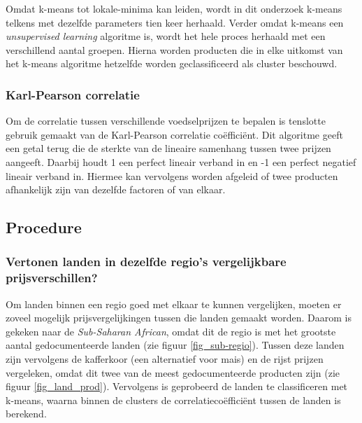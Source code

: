 \documentclass{article}
\begin{document}
Omdat k-means tot lokale-minima kan leiden, wordt in dit onderzoek k-means telkens met dezelfde parameters tien keer herhaald. Verder omdat k-means een \textit{unsupervised learning} algoritme is, wordt het hele proces herhaald met een verschillend aantal groepen. Hierna worden producten die in elke uitkomst van het k-means algoritme hetzelfde worden geclassificeerd als cluster beschouwd.


\subsubsection*{Karl-Pearson correlatie}
Om de correlatie tussen verschillende voedselprijzen te bepalen is tenslotte gebruik gemaakt van de Karl-Pearson correlatie coëfficiënt.
Dit algoritme geeft een getal terug die de sterkte van de lineaire samenhang tussen twee prijzen aangeeft. Daarbij houdt 1 een perfect lineair verband in en -1 een perfect negatief lineair verband in. Hiermee kan vervolgens worden afgeleid of twee producten afhankelijk zijn van dezelfde factoren of van elkaar.


\subsection*{Procedure}

\subsubsection*{Vertonen landen in dezelfde regio’s vergelijkbare prijsverschillen?}
Om landen binnen een regio goed met elkaar te kunnen vergelijken, moeten er zoveel mogelijk prijsvergelijkingen tussen die landen gemaakt worden. Daarom is gekeken naar de \textit{Sub-Saharan African}, omdat dit de regio is met het grootste aantal gedocumenteerde landen (zie figuur \ref{fig_sub-regio}). Tussen deze landen zijn vervolgens de kafferkoor (een alternatief voor mais) en de rijst prijzen vergeleken, omdat dit twee van de meest gedocumenteerde producten zijn (zie figuur \ref{fig_land_prod}). 
Vervolgens is geprobeerd de landen te classificeren met k-means, waarna binnen de clusters de correlatiecoëfficiënt tussen de landen is berekend.
\end{document}
